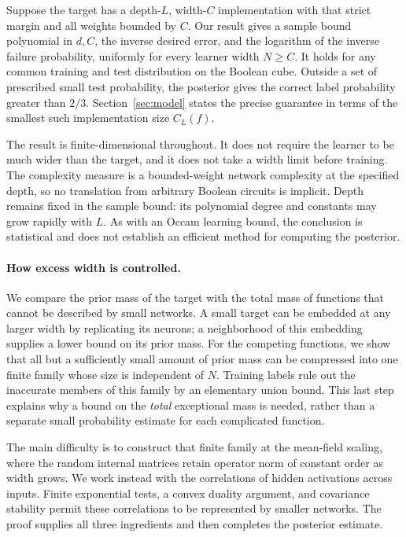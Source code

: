\documentclass[11pt]{article}
\theoremstyle{remark}\newtheorem{remark}[theorem]{Remark}
\begin{document}
Suppose the target has a depth-$L$, width-$C$ implementation with that
strict margin and all weights bounded by $C$. Our result gives a sample
bound polynomial in $d,C$, the inverse desired error, and the logarithm of
the inverse failure probability, uniformly for every learner width
$N\geq C$. It holds for any common training and test distribution on the
Boolean cube. Outside a set of prescribed small test probability, the
posterior gives the correct label probability greater than $2/3$.
Section~\ref{sec:model} states the precise guarantee in
terms of the smallest such implementation size $C_L(f)$.

The result is finite-dimensional throughout. It does not require the learner
to be much wider than the target, and it does not take a width limit before
training. The complexity measure is a bounded-weight network complexity at
the specified depth, so no translation from arbitrary Boolean circuits is
implicit. Depth remains fixed in the sample bound: its polynomial degree
and constants may grow rapidly with $L$. As with an Occam learning bound,
the conclusion is statistical and does not establish an efficient method
for computing the posterior.

\paragraph{How excess width is controlled.}
We compare the prior mass of the target with the total mass of functions
that cannot be described by small networks. A small target can be embedded
at any larger width by replicating its neurons; a neighborhood of this
embedding supplies a lower bound on its prior mass. For the competing
functions, we show that all but a sufficiently small amount of prior mass
can be compressed into one finite family whose size is independent of $N$.
Training labels rule out the inaccurate members of this family by an
elementary union bound. This last step explains why a bound on the
\emph{total} exceptional mass is needed, rather than a separate small
probability estimate for each complicated function.

The main difficulty is to construct that finite family at the mean-field
scaling, where the random internal matrices retain operator norm of
constant order as width grows. We work instead with the correlations of
hidden activations across inputs. Finite exponential tests, a convex
duality argument, and covariance stability permit these correlations to be
represented by smaller networks. The proof supplies all three
ingredients and then completes the posterior estimate.
\end{document}
